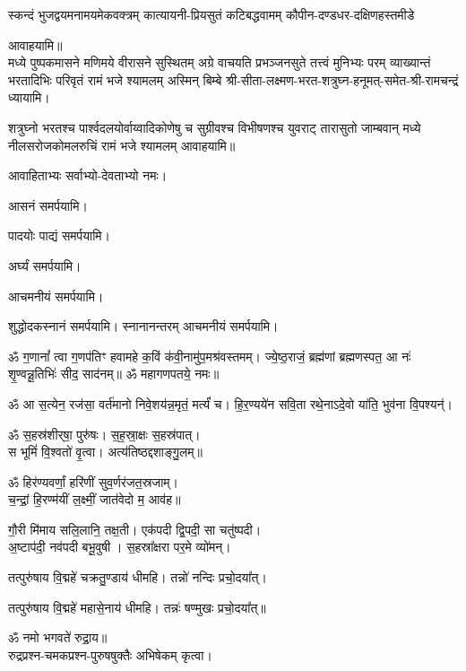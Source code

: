 \begin{center}
{स्कन्दं भुजद्वयमनामयमेकवक्त्रम्}
{कात्यायनी-प्रियसुतं कटिबद्धवामम्}
{कौपीन-दण्डधर-दक्षिणहस्तमीडे}

आवाहयामि॥\\

{मध्ये पुष्पकमासने मणिमये वीरासने सुस्थितम्}
{अग्रे वाचयति प्रभञ्जनसुते तत्त्वं मुनिभ्यः परम्}
{व्याख्यान्तं भरतादिभिः परिवृतं रामं भजे श्यामलम्}
अस्मिन् बिम्बे श्री-सीता-लक्ष्मण-भरत-शत्रुघ्न-हनूमत्-समेत-श्री-रामचन्द्रं ध्यायामि। 

{शत्रुघ्नो भरतश्च पार्श्वदलयोर्वाय्वादिकोणेषु च}
{सुग्रीवश्च विभीषणश्च युवराट् तारासुतो जाम्बवान्}
{मध्ये नीलसरोजकोमलरुचिं रामं भजे श्यामलम्}
आवाहयामि॥\\\medskip

आवाहिताभ्यः सर्वाभ्यो-देवताभ्यो नमः।

आसनं समर्पयामि।

पादयोः पाद्यं समर्पयामि।

अर्घ्यं समर्पयामि।

आचमनीयं समर्पयामि।

शुद्धोदकस्नानं समर्पयामि। स्नानानन्तरम् आचमनीयं समर्पयामि।



ॐ ग॒णानां᳚ त्वा ग॒णप॑तिꣳ हवामहे क॒विं क॑वी॒नामु॑प॒मश्र॑\-वस्तमम्। 
ज्ये॒ष्ठ॒राजं॒ ब्रह्म॑णां ब्रह्मणस्पत॒ आ नः॑ शृ॒ण्वन्नू॒तिभिः॑ सीद॒ साद॑नम्॥ 
ॐ महागणपतये॒ नमः॥ 

ॐ आ स॒त्येन॒ रज॑सा॒ वर्त॑मानो निवे॒शय॑न्न॒मृतं॒ मर्त्यं॑ च। हि॒र॒ण्यये॑न सवि॒ता रथे॒नाऽदे॒वो या॑ति॒ भुव॑ना वि॒पश्यन्॑।

ॐ स॒हस्र॑शीर्‌षा॒ पुरु॑षः। स॒ह॒स्रा॒क्षः स॒हस्र॑पात्।\\
स भूमिं॑ वि॒श्वतो॑ वृ॒त्वा। अत्य॑तिष्ठद्दशाङ्गु॒लम्॥

ॐ हिर॑ण्यवर्णां॒ हरि॑णीं सुव॒र्णर॑जत॒स्रजाम्।\\
च॒न्द्रां॒ हि॒रण्म॑यीं ल॒क्ष्मीं॒ जात॑वेदो म॒ आव॑ह॥

गौ॒री मि॑माय सलि॒लानि॒ तक्ष॒ती। एक॑पदी द्वि॒पदी॒ सा चतु॑ष्पदी।\\
अ॒ष्टाप॑दी॒ नव॑पदी बभू॒वुषी। स॒हस्रा᳚क्षरा पर॒मे व्यो॑मन्।

तत्पुरु॑षाय वि॒द्महे॑ चक्रतु॒ण्डाय॑ धीमहि। तन्नो॑ नन्दिः प्रचो॒दया᳚त्। 

तत्पुरु॑षाय वि॒द्महे॑ महासे॒नाय॑ धीमहि। तन्नः॑ षण्मुखः प्रचो॒दया᳚त्॥


ॐ नमो भगवते॑ रुद्रा॒य॥\\
रुद्रप्रश्न-चमकप्रश्न-पुरुषषुक्तैः अभिषेकम् कृत्वा।


\end{center}
